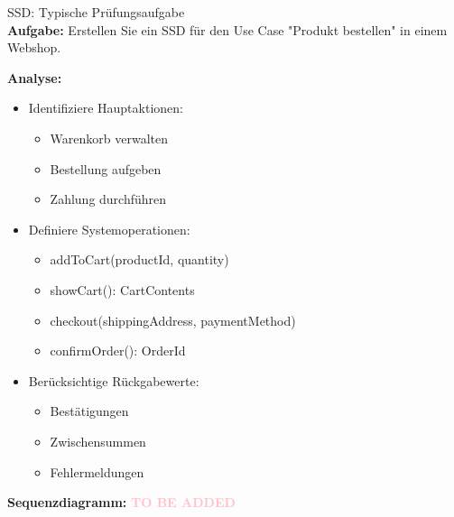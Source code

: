\columnbreak

\begin{example2}{SSD: Typische Prüfungsaufgabe}\\
\textbf{Aufgabe:} Erstellen Sie ein SSD für den Use Case "Produkt bestellen" in einem Webshop.

\textbf{Analyse:}
\begin{itemize}
    \item Identifiziere Hauptaktionen:
    \begin{itemize}
        \item Warenkorb verwalten
        \item Bestellung aufgeben
        \item Zahlung durchführen
    \end{itemize}
    
    \item Definiere Systemoperationen:
    \begin{itemize}
        \item addToCart(productId, quantity)
        \item showCart(): CartContents
        \item checkout(shippingAddress, paymentMethod)
        \item confirmOrder(): OrderId
    \end{itemize}
    
    \item Berücksichtige Rückgabewerte:
    \begin{itemize}
        \item Bestätigungen
        \item Zwischensummen
        \item Fehlermeldungen
    \end{itemize}
\end{itemize}

\textbf{Sequenzdiagramm:} %
\textcolor{pink}{\textbf{TO BE ADDED}}
\end{example2}

\columnbreak

